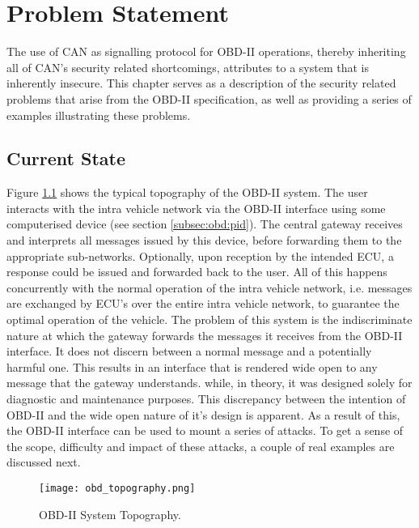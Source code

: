
\chapter{Problem Statement}
\label{chap:problem_statement}

The use of CAN as signalling protocol for OBD-II operations, thereby inheriting all of CAN's security related shortcomings, attributes to a system that is inherently insecure. This chapter serves as a description of the security related problems that arise from the OBD-II specification, as well as providing a series of examples illustrating these problems.

\section{Current State}
\label{sec:current_state}

Figure \ref{fig:topography} shows the typical topography of the OBD-II system. The user interacts with the intra vehicle network via the OBD-II interface using some computerised device (see section \ref{subsec:obd:pid}). The central gateway receives and interprets all messages issued by this device, before forwarding them to the appropriate sub-networks. Optionally, upon reception by the intended ECU, a response could be issued and forwarded back to the user. All of this happens concurrently with the normal operation of the intra vehicle network, i.e. messages are exchanged by ECU's over the entire intra vehicle network, to guarantee the optimal operation of the vehicle. The problem of this system is the indiscriminate nature at which the gateway forwards the messages it receives from the OBD-II interface. It does not discern between a normal message and a potentially harmful one. This results in an interface that is rendered wide open to any message that the gateway understands. while, in theory, it was designed solely for diagnostic and maintenance purposes. This discrepancy between the intention of OBD-II and the wide open nature of it's design is apparent. As a result of this, the OBD-II interface can be used to mount a series of attacks. To get a sense of the scope, difficulty and impact of these attacks, a couple of real examples are discussed next.

\begin{figure}[h]
	\label{fig:topography}
	\centering
	\texttt{[image: obd\_topography.png]}
	\caption{OBD-II System Topography.}
\end{figure}

